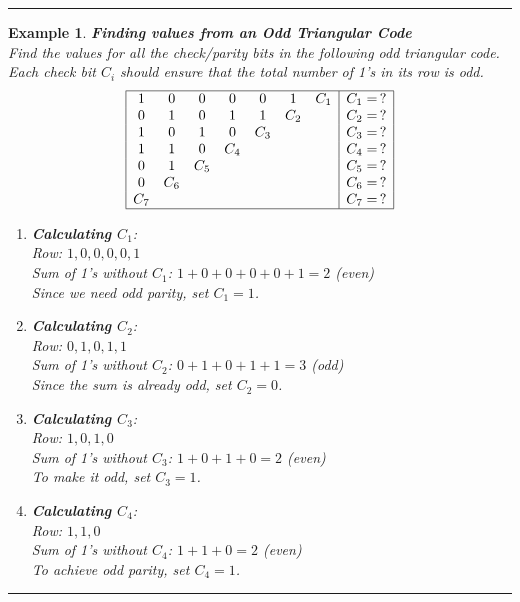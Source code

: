 \documentclass[12pt]{article}
\newtheorem{example}{Example}
\newenvironment{examp}
{\vspace{0.5cm}
 \hrule
\vspace{0.5cm}
\begin{example}}
{\hrule
\vspace{0.5cm}
\end{example}}
\begin{document}
\begin{examp} \textbf{Finding values from an Odd Triangular Code}\\ Find
	the values for all the check/parity bits in the following odd triangular
	code. Each check bit \( C_i \) should ensure that the total number of
	1's in its row is odd. \[ \begin{array}{|ccccccc|c|} \hline
			1 & 0   & 0   & 0   & 0   & 1          & C_1 & C_1 = \, ? \\
			0 & 1   & 0   & 1   & 1   & C_2        &     & C_2 = \, ? \\
			1 & 0   & 1   & 0   & C_3 &            &     & C_3 = \, ? \\
			1 & 1   & 0   & C_4 &     &            &     & C_4 = \, ? \\
			0 & 1   & C_5 &     &     &            &     & C_5 = \, ? \\
			0 & C_6 &     &     &     &            &     & C_6 = \, ? \\ C_7 &     &
			  &     &     &     &     & C_7 = \, ?                    \\ \hline\end{array} \]
	\begin{enumerate} \item \textbf{Calculating \( C_1 \)}: \\ Row: \( 1,
		      0, 0, 0, 0, 1 \) \\ Sum of 1's without \( C_1 \): \( 1 + 0 + 0 + 0 +
		      0 + 1 = 2 \) (even) \\ Since we need odd parity, set \( C_1 = 1 \).

		\item \textbf{Calculating \( C_2 \)}: \\ Row: \( 0, 1, 0, 1, 1 \) \\
		      Sum of 1's without \( C_2 \): \( 0 + 1 + 0 + 1 + 1 = 3 \) (odd) \\
		      Since the sum is already odd, set \( C_2 = 0 \).

		\item \textbf{Calculating \( C_3 \)}: \\ Row: \( 1, 0, 1, 0 \) \\
		      Sum of 1's without \( C_3 \): \( 1 + 0 + 1 + 0 = 2 \) (even) \\ To
		      make it odd, set \( C_3 = 1 \).

		\item \textbf{Calculating \( C_4 \)}: \\ Row: \( 1, 1, 0 \) \\ Sum
		      of 1's without \( C_4 \): \( 1 + 1 + 0 = 2 \) (even) \\ To achieve
		      odd parity, set \( C_4 = 1 \).


\end{enumerate}
\end{examp}
\end{document}

